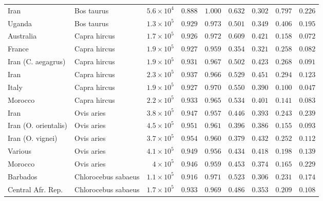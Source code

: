 \documentclass{article}
\begin{document}
\begin{center}
\begin{adjustbox}{width=\textwidth}
\begin{tabular}{||l|l|r||r|r||r|r||r|r||}
                Iran & Bos taurus & $5.6\times 10^{4}$ & $ 0.888$ & $ 1.000$ & $ 0.632$ & $ 0.302$ & $ 0.797$ & $ 0.226$ \\
                Uganda & Bos taurus & $1.3\times 10^{5}$ & $ 0.929$ & $ 0.973$ & $ 0.501$ & $ 0.349$ & $ 0.406$ & $ 0.195$ \\
                \rowcolor{LIGHTGREY} Australia & Capra hircus & $1.7\times 10^{5}$ & $ 0.926$ & $ 0.972$ & $ 0.609$ & $ 0.421$ & $ 0.158$ & $ 0.072$ \\
                \rowcolor{LIGHTGREY} France & Capra hircus & $1.9\times 10^{5}$ & $ 0.927$ & $ 0.959$ & $ 0.354$ & $ 0.321$ & $ 0.258$ & $ 0.082$ \\
                \rowcolor{LIGHTGREY} Iran (C. aegagrus) & Capra hircus & $1.9\times 10^{5}$ & $ 0.931$ & $ 0.967$ & $ 0.502$ & $ 0.423$ & $ 0.268$ & $ 0.091$ \\
                \rowcolor{LIGHTGREY} Iran & Capra hircus & $2.3\times 10^{5}$ & $ 0.937$ & $ 0.966$ & $ 0.529$ & $ 0.451$ & $ 0.294$ & $ 0.123$ \\
                \rowcolor{LIGHTGREY} Italy & Capra hircus & $1.9\times 10^{5}$ & $ 0.927$ & $ 0.970$ & $ 0.550$ & $ 0.390$ & $ 0.100$ & $ 0.047$ \\
                \rowcolor{LIGHTGREY} Morocco & Capra hircus & $2.2\times 10^{5}$ & $ 0.933$ & $ 0.965$ & $ 0.534$ & $ 0.401$ & $ 0.141$ & $ 0.083$ \\
                Iran & Ovis aries & $3.8\times 10^{5}$ & $ 0.947$ & $ 0.957$ & $ 0.446$ & $ 0.393$ & $ 0.243$ & $ 0.239$ \\
                Iran (O. orientalis) & Ovis aries & $4.5\times 10^{5}$ & $ 0.951$ & $ 0.961$ & $ 0.396$ & $ 0.386$ & $ 0.155$ & $ 0.093$ \\
                Iran (O. vignei) & Ovis aries & $3.7\times 10^{5}$ & $ 0.954$ & $ 0.960$ & $ 0.379$ & $ 0.432$ & $ 0.252$ & $ 0.112$ \\
                Various & Ovis aries & $4.1\times 10^{5}$ & $ 0.949$ & $ 0.956$ & $ 0.434$ & $ 0.418$ & $ 0.198$ & $ 0.139$ \\
                Morocco & Ovis aries & $ 4\times 10^{5}$ & $ 0.946$ & $ 0.959$ & $ 0.453$ & $ 0.374$ & $ 0.165$ & $ 0.229$ \\
                \rowcolor{LIGHTGREY} Barbados & Chlorocebus sabaeus & $1.1\times 10^{5}$ & $ 0.916$ & $ 0.971$ & $ 0.523$ & $ 0.306$ & $ 0.231$ & $ 0.174$ \\
                \rowcolor{LIGHTGREY} Central Afr. Rep. & Chlorocebus sabaeus & $1.7\times 10^{5}$ & $ 0.933$ & $ 0.969$ & $ 0.486$ & $ 0.353$ & $ 0.209$ & $ 0.108$ \\

\end{tabular}
\end{adjustbox}
\end{center}
\end{document}

